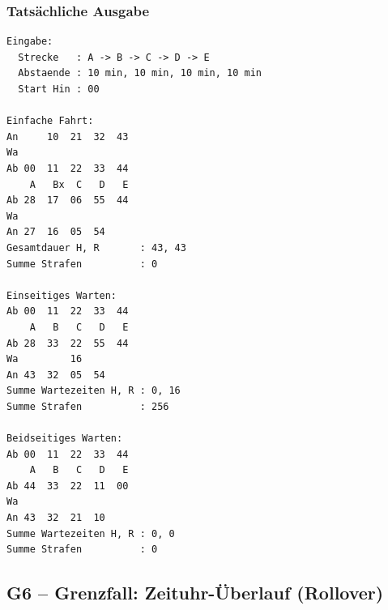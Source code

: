 \documentclass[12pt,a4paper]{article}
\begin{document}
\hfill
\begin{minipage}[t]{0.48\textwidth}
\scriptsize
\subsubsection*{Tatsächliche Ausgabe}
\begin{lstlisting}
Eingabe:
  Strecke   : A -> B -> C -> D -> E
  Abstaende : 10 min, 10 min, 10 min, 10 min
  Start Hin : 00

Einfache Fahrt:
An     10  21  32  43
Wa
Ab 00  11  22  33  44
    A   Bx  C   D   E
Ab 28  17  06  55  44
Wa
An 27  16  05  54
Gesamtdauer H, R       : 43, 43
Summe Strafen          : 0

Einseitiges Warten:
Ab 00  11  22  33  44
    A   B   C   D   E
Ab 28  33  22  55  44
Wa         16
An 43  32  05  54
Summe Wartezeiten H, R : 0, 16
Summe Strafen          : 256

Beidseitiges Warten:
Ab 00  11  22  33  44
    A   B   C   D   E
Ab 44  33  22  11  00
Wa
An 43  32  21  10
Summe Wartezeiten H, R : 0, 0
Summe Strafen          : 0
\end{lstlisting}
\end{minipage}

\subsection{G6 – Grenzfall: Zeituhr-Überlauf (Rollover)}
\label{test:g6}
\end{document}
